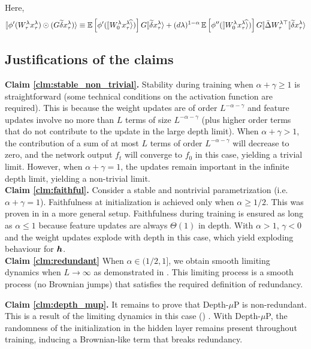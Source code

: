 \documentclass{article}
\theoremstyle{plain}
\theoremstyle{definition}
\begin{document}
Here, 
\[
\ket{\phi'(W_{\tau}^{\lambda}x_{\tau}^{\lambda})\odot(G\tilde\delta x_{\tau}^{\lambda})}\equiv\EV\left[\phi'(\hatket{W_{0}^{\lambda}x_{\tau}^{\lambda}})\right]G\ket{\tilde\delta x_{\tau}^{\lambda}}+(d\lambda)^{1-\alpha}\EV\left[\phi''(\hatket{W_{0}^{\lambda}x_{\tau}^{\lambda}})\right]G\oplim{\bar{\Delta}W_{\tau}^{\lambda\trsp}}\tilde\delta x_{\tau}^{\lambda}\ra
\]

\subsection{Justifications of the claims}\label{sec:claim_justifications}
\textbf{Claim \ref{clm:stable_non_trivial}.} Stability during training when $\alpha+\gamma\geq1$ is straightforward (some technical conditions on the activation function are required). This is because the weight updates are of order $L^{-\alpha-\gamma}$ and feature updates involve no more than $L$ terms of size $L^{-\alpha-\gamma}$ (plus higher order terms that do not contribute to the update in the large depth limit). When $\alpha +\gamma >1$, the contribution of a sum of at most $L$ terms of order $L^{-\alpha - \gamma}$ will decrease to zero, and the network output $f_t$ will converge to $f_0$ in this case, yielding a trivial limit. However, when $\alpha + \gamma=1$, the updates remain important in the infinite depth limit, yielding a non-trivial limit.\\

\textbf{Claim \ref{clm:faithful}.} Consider a stable and nontrivial parametrization (i.e. $\alpha+\gamma=1$). Faithfulness at initialization is achieved only when $\alpha\geq 1/2$. This was proven in \cite{hayou21stable} in a more general setup. Faithfulness during training is ensured as long as $\alpha\leq 1$ because feature updates are always $\Theta(1)$ in depth. With $\alpha>1$, $\gamma<0$ and the weight updates explode with depth in this case, which yield exploding behaviour for $\boldsymbol{h}$.\\

\textbf{Claim \ref{clm:redundant}} When $\alpha \in (1/2,1]$, we obtain smooth limiting dynamics when $L\to \infty$ as demonstrated in . This limiting process is a smooth process (no Brownian jumps) that satisfies the required definition of redundancy.

\textbf{Claim \ref{clm:depth_mup}.} It remains to prove that Depth-$\mu$P is non-redundant. This is a result of the limiting dynamics in this case () . With Depth-$\mu$P, the randomness of the initialization in the hidden layer remains present throughout training, inducing a Brownian-like term that breaks redundancy. 
\end{document}
